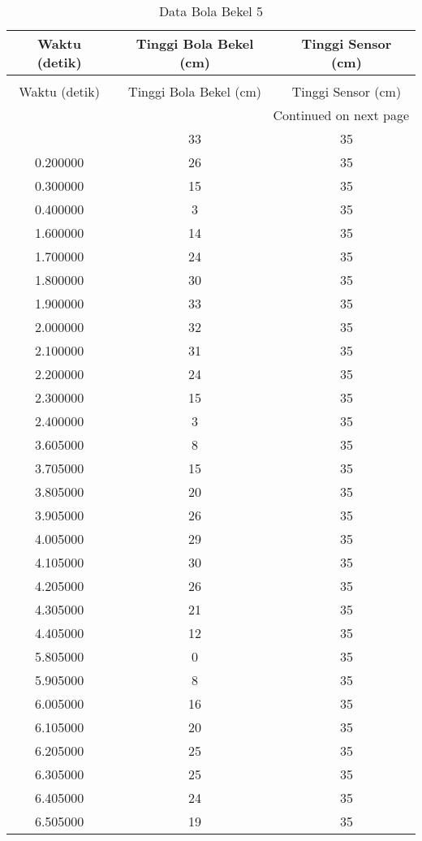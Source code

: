 \begin{longtable}[htbp]{|c|c|c|}
\caption{Data Bola Bekel 5} \\
\hline
Waktu (detik) & Tinggi Bola Bekel (cm) & Tinggi Sensor (cm) \\ \hline
\endfirsthead
\caption[]{Data Bola Bekel 5} \\
\hline
Waktu (detik) & Tinggi Bola Bekel (cm) & Tinggi Sensor (cm) \\ \hline
\endhead
\multicolumn{3}{r}{Continued on next page} \\
\endfoot
\endlastfoot
0.100000 & 33 & 35 \\ \hline
0.200000 & 26 & 35 \\ \hline
0.300000 & 15 & 35 \\ \hline
0.400000 & 3 & 35 \\ \hline
1.600000 & 14 & 35 \\ \hline
1.700000 & 24 & 35 \\ \hline
1.800000 & 30 & 35 \\ \hline
1.900000 & 33 & 35 \\ \hline
2.000000 & 32 & 35 \\ \hline
2.100000 & 31 & 35 \\ \hline
2.200000 & 24 & 35 \\ \hline
2.300000 & 15 & 35 \\ \hline
2.400000 & 3 & 35 \\ \hline
3.605000 & 8 & 35 \\ \hline
3.705000 & 15 & 35 \\ \hline
3.805000 & 20 & 35 \\ \hline
3.905000 & 26 & 35 \\ \hline
4.005000 & 29 & 35 \\ \hline
4.105000 & 30 & 35 \\ \hline
4.205000 & 26 & 35 \\ \hline
4.305000 & 21 & 35 \\ \hline
4.405000 & 12 & 35 \\ \hline
5.805000 & 0 & 35 \\ \hline
5.905000 & 8 & 35 \\ \hline
6.005000 & 16 & 35 \\ \hline
6.105000 & 20 & 35 \\ \hline
6.205000 & 25 & 35 \\ \hline
6.305000 & 25 & 35 \\ \hline
6.405000 & 24 & 35 \\ \hline
6.505000 & 19 & 35 \\ \hline

\end{longtable}
